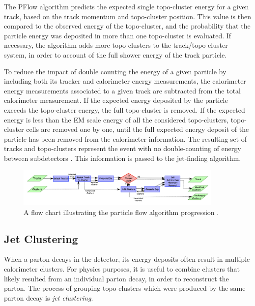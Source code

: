 The PFlow algorithm predicts the expected single topo-cluster energy for a given track, based on the track momentum and topo-cluster position. This value is then compared to the observed energy of the topo-cluster, and the probability that the particle energy was deposited in more than one topo-cluster is evaluated. If necessary, the algorithm adds more topo-clusters to the track/topo-cluster system, in order to account of the full shower energy of the track particle. \par

To reduce the impact of double counting the energy of a given particle by including both its tracker and calorimeter energy measurements, the calorimeter energy measurements associated to a given track are subtracted from the total calorimeter measurement. If the expected energy deposited by the particle exceeds the topo-cluster energy, the full topo-cluster is removed. If the expected energy is less than the EM scale energy of all the considered topo-clusters, topo-cluster cells are removed one by one, until the full expected energy deposit of the particle has been removed from the calorimeter information. The resulting set of tracks and topo-clusters represent the event with no double-counting of energy between subdetectors \cite{pflow}. This information is passed to the jet-finding algorithm.

\begin{figure}[h]
        \centering
	\includegraphics[width=0.9\textwidth]{figures/ch5/pflow_diagram}
	\caption{ A flow chart illustrating the particle flow algorithm progression \cite{pflow}. }
	\label{fig:pflow_diagram}
\end{figure}

\subsection{Jet Clustering}
When a parton decays in the detector, its energy deposits often result in multiple calorimeter clusters. For physics purposes, it is useful to combine clusters that likely resulted from an individual parton decay, in order to reconstruct the parton. The process of grouping topo-clusters which were produced by the same parton decay is \textit{jet clustering}. \par

